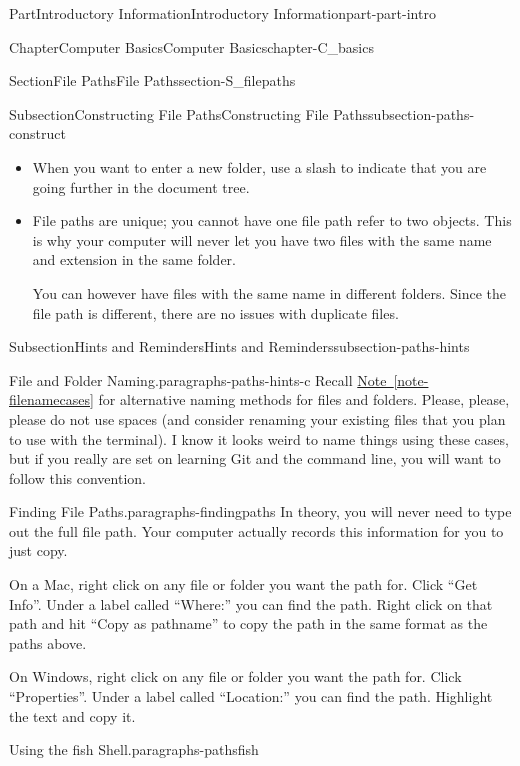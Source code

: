 \documentclass[oneside,10pt,]{book}
\newcommand{\xreffont}{\relax}
\begin{document}
\begin{partptx}{Part}{Introductory Information}{}{Introductory Information}{}{}{part-part-intro}
\begin{chapterptx}{Chapter}{Computer Basics}{}{Computer Basics}{}{}{chapter-C_basics}
\begin{sectionptx}{Section}{File Paths}{}{File Paths}{}{}{section-S_filepaths}
\begin{subsectionptx}{Subsection}{Constructing File Paths}{}{Constructing File Paths}{}{}{subsection-paths-construct}
\begin{itemize}[label=\textbullet]
\item{}When you want to enter a new folder, use a slash to indicate that you are going further in the document tree.%
\item{}File paths are unique; you cannot have one file path refer to two objects. This is why your computer will never let you have two files with the same name and extension in the same folder.%
\par
You can however have files with the same name in different folders. Since the file path is different, there are no issues with duplicate files.%
\end{itemize}
%
\end{subsectionptx}
%
%
\typeout{************************************************}
\typeout{************************************************}
%
\begin{subsectionptx}{Subsection}{Hints and Reminders}{}{Hints and Reminders}{}{}{subsection-paths-hints}
%
\begin{paragraphs}{File and Folder Naming.}{paragraphs-paths-hints-c}%
Recall \hyperref[note-filenamecases]{Note~{\xreffont\ref{note-filenamecases}}} for alternative naming methods for files and folders. Please, please, please do not use spaces (and consider renaming your existing files that you plan to use with the terminal). I know it looks weird to name things using these cases, but if you really are set on learning Git and the command line, you will want to follow this convention.%
\end{paragraphs}%
\begin{paragraphs}{Finding File Paths.}{paragraphs-findingpaths}%
%
In theory, you will never need to type out the full file path. Your computer actually records this information for you to just copy.%
\par
On a Mac, right click on any file or folder you want the path for. Click ``Get Info''. Under a label called ``Where:'' you can find the path. Right click on that path and hit ``Copy as pathname'' to copy the path in the same format as the paths above.%
\par
On Windows, right click on any file or folder you want the path for. Click ``Properties''. Under a label called ``Location:'' you can find the path. Highlight the text and copy it.%
\end{paragraphs}%
\begin{paragraphs}{Using the fish Shell.}{paragraphs-pathsfish}%
%

\end{paragraphs}
\end{subsectionptx}
\end{sectionptx}
\end{chapterptx}
\end{partptx}
\end{document}
